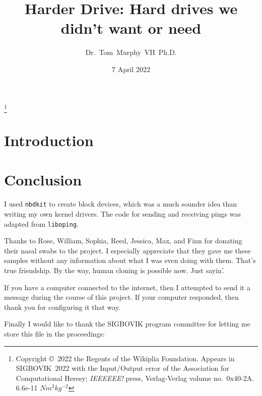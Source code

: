 \documentclass[twocolumn]{article}
\begin{document}
\title{Harder Drive: Hard drives we didn't want or need}
\author{Dr.~Tom~Murphy~VII~Ph.D.}\thanks{
Copyright \copyright\ 2022 the Regents of the Wikiplia Foundation.
Appears in SIGBOVIK~2022 with the
Input/Output error of the Association for Computational Heresy; {\em IEEEEEE!}
press, Verlag-Verlag volume no.~0x40-2A. 6.6e-11 $N m^2kg^{-2}$
}

\renewcommand\th{\ensuremath{{}^{\textrm{th}}}}
\newcommand\st{\ensuremath{{}^{\textrm{st}}}}
\newcommand\rd{\ensuremath{{}^{\textrm{rd}}}}
\newcommand\nd{\ensuremath{{}^{\textrm{nd}}}}

\renewcommand\paragraph[1]{\smallskip \noindent{\bf #1}\enspace}

\date{7 April 2022}

\maketitle \thispagestyle{empty}

\sloppypar


\section{Introduction}

\section{Conclusion}

\paragraph{Acknowledgements.}

I used {\tt nbdkit} to create block devices, which was a much sounder
idea than writing my own kernel drivers. The code for sending and
receiving pings was adapted from {\tt liboping}.

Thanks to Rose, William, Sophia, Reed, Jessica, Max, and Finn for
donating their nasal swabs to the project. I especially appreciate
that they gave me these samples without any information about what I
was even doing with them. That's true friendship. By the way, human
cloning is possible now. Just sayin'.

If you have a computer connected to the internet, then I attempted
to send it a message during the course of this project. If your
computer responded, then thank you for configuring it that way.

Finally I would like to thank the SIGBOVIK program committee for letting
me store this file in the proceedings:

%


\nocite{murphy2019eloworld}

{}

\end{document}
